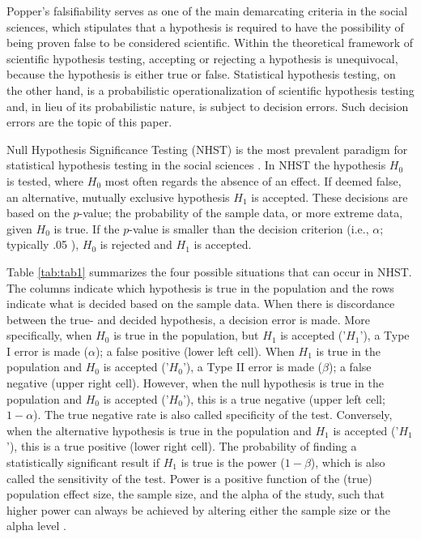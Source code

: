 \documentclass{article}
\begin{document}
Popper's \cite{Popper2005-xu} falsifiability serves as one of the main demarcating criteria in the social sciences, which stipulates that a hypothesis is required to have the possibility of being proven false to be considered scientific. Within the theoretical framework of scientific hypothesis testing, accepting or rejecting a hypothesis is unequivocal, because the hypothesis is either true or false. Statistical hypothesis testing, on the other hand, is a probabilistic operationalization of scientific hypothesis testing \cite{meehl1978theoretical} and, in lieu of its probabilistic nature, is subject to decision errors. Such decision errors are the topic of this paper.

Null Hypothesis Significance Testing (NHST) is the most prevalent paradigm for statistical hypothesis testing in the social sciences \cite{American_Psychological_Association2010-qe}. In NHST the hypothesis $H_0$ is tested, where $H_0$ most often regards the absence of an effect. If deemed false, an alternative, mutually exclusive hypothesis $H_1$ is accepted. These decisions are based on the $p$-value; the probability of the sample data, or more extreme data, given $H_0$ is true. If the $p$-value is smaller than the decision criterion (i.e., $\alpha$; typically .05 \cite{Nuijten2015-od}), $H_0$ is rejected and $H_1$ is accepted.

Table \ref{tab:tab1} summarizes the four possible situations that can occur in NHST. The columns indicate which hypothesis is true in the population and the rows indicate what is decided based on the sample data. When there is discordance between the true- and decided hypothesis, a decision error is made. More specifically, when $H_0$ is true in the population, but $H_1$ is accepted ('$H_1$'), a Type I error is made ($\alpha$); a false positive (lower left cell). When $H_1$ is true in the population and $H_0$ is accepted ('$H_0$'), a Type II error is made ($\beta$); a false negative (upper right cell). However, when the null hypothesis is true in the population and $H_0$ is accepted ('$H_0$'), this is a true negative (upper left cell; $1-\alpha$). The true negative rate is also called specificity of the test. Conversely, when the alternative hypothesis is true in the population and $H_1$ is accepted ('$H_1$'), this is a true positive (lower right cell). The probability of finding a statistically significant result if $H_1$ is true is the power ($1-\beta$), which is also called the sensitivity of the test. Power is a positive function of the (true) population effect size, the sample size, and the alpha of the study, such that higher power can always be achieved by altering either the sample size or the alpha level \cite{Aberson2010-xa}. 
\end{document}
